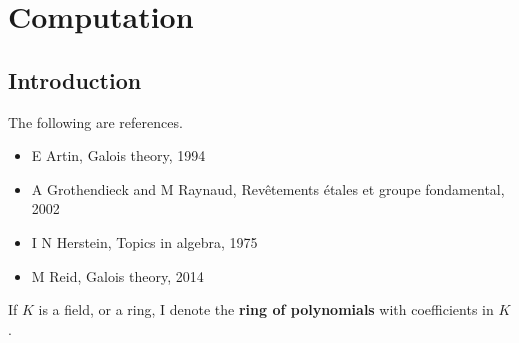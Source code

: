 \documentclass[../Year1.tex]{subfiles}
\begin{document}
\chapter{Computation}
\renewcommand*\thesection{\arabic{section}}

\section{Introduction}


The following are references.
\begin{itemize}
\item E Artin, Galois theory, 1994
\item A Grothendieck and M Raynaud, Rev\^etements \'etales et groupe fondamental, 2002
\item I N Herstein, Topics in algebra, 1975
\item M Reid, Galois theory, 2014
\end{itemize}

\begin{notation*}
If $ K $ is a field, or a ring, I denote
the \textbf{ring of polynomials} with coefficients in $ K $.
\end{notation*}
\end{document}
